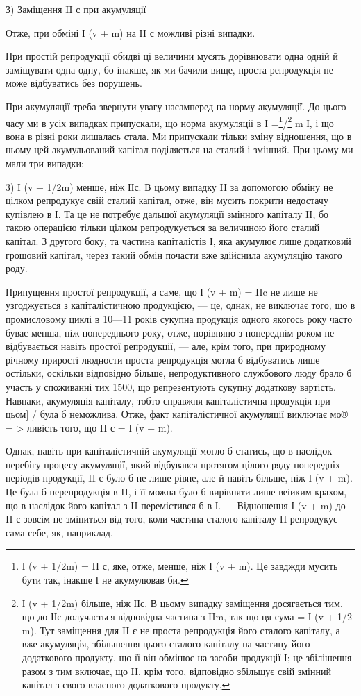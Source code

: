 З) Заміщення II с при акумуляції

Отже, при обміні І (v + m) на II с можливі різні випадки.

При простій репродукції обидві ці величини мусять дорівнювати одна
одній й заміщувати одна одну, бо інакше, як ми бачили вище, проста
репродукція не може відбуватись без порушень.

При акумуляції треба звернути увагу насамперед на норму акумуляції.
До цього часу ми в усіх випадках припускали, що норма акумуляції в
I =\footnote{
І (v + 1/2m) = II с, яке, отже, менше, ніж І (v + m). Це завджди
мусить бути так, інакше І не акумулював би.
}/\footnote{
І (v + 1/2m) більше, ніж ІІс. В цьому випадку заміщення досягається
тим, що до ІІс долучається відповідна частина з IIm, так що
ця сума = І (v + 1/2 m). Тут заміщення для II є не проста репродукція
його сталого капіталу, а вже акумуляція, збільшення цього сталого капіталу
на частину його додаткового продукту, що її він обмінює на засоби
продукції І; це збілішення разом з тим включає, що II, крім того, відповідно
збільшує свій змінний капітал з свого власного додаткового продукту,
} m І, і що вона в різні роки лишалась стала. Ми припускали
тільки зміну відношення, що в ньому цей акумульований капітал поділяється
на сталий і змінний. При цьому ми мали три випадки:

3) І (v + 1/2m) менше, ніж ІІс. В цьому випадку II за допомогою
обміну не цілком репродукує свій сталий капітал, отже, він мусить покрити
недостачу купівлею в І. Та це не потребує дальшої акумуляції
змінного капіталу II, бо такою операцією тільки цілком репродукується
за величиною його сталий капітал. З другого боку, та частина капіталістів
І, яка акумулює лише додатковий грошовий капітал, через такий
обмін почасти вже здійснила акумуляцію такого роду.

Припущення простої репродукції, а саме, що І (v + m) = IIc не лише
не узгоджується з капіталістичною продукцією, — це, однак, не виключає
того, що в промисловому циклі в 10—11 років сукупна продукція одного
якогось року часто буває менша, ніж попереднього року, отже,
порівняно з попереднім роком не відбувається навіть простої репродукції,
— але, крім того, при природному річному прирості людности проста
репродукція могла б відбуватись лише остільки, оскільки відповідно
більше, непродуктивного службового люду брало б участь у споживанні
тих 1500, що репрезентують сукупну додаткову вартість. Навпаки, акумуляція
капіталу, тобто справжня капіталістична продукція при цьом] /
була б неможлива. Отже, факт капіталістичної акумуляції виключає мо® = >
ливість того, що II с = І (v + m).

Однак, навіть при капіталістичній акумуляції могло б статись, що в
наслідок перебігу процесу акумуляції, який відбувався протягом цілого
ряду попередніх періодів продукції, II с було б не лише рівне, але й навіть
більше, ніж І (v + m). Це була б перепродукція в II, і її можна було б
вирівняти лише веіиким крахом, що в наслідок його капітал з II перемістився
б в І. — Відношення І (v + m) до II с зовсім не зміниться від того,
коли частина сталого капіталу II репродукує сама себе, як, наприклад,
